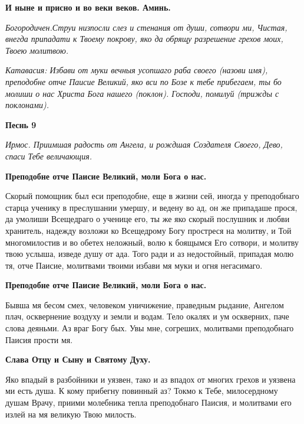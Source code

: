 \bfseries И ныне и присно и во веки веков. Аминь\normalfont{}. 




\itshape Богородичен.\normalfont{}Струи низпосли слез и стенания от души, сотвори ми, Чистая, внегда припадати к Твоему покрову, яко да обрящу разрешение грехов моих, Твоею молитвою.




\itshape Катавасия:\normalfont{} Избави от муки вечныя усопшаго раба своего (\itshape назови имя\normalfont{}), преподобне отче Паисие Великий, яко вси по Бозе к тебе прибегаем, ты бо молиши о нас Христа Бога нашего (\itshape поклон\normalfont{}). Господи, помилуй (\itshape трижды с поклонами\normalfont{}). 




\bfseries Песнь 9 \normalfont{}\nopagebreak




\itshape Ирмос\normalfont{}. Приимшая радость от Ангела, и рождшая Создателя Своего, Дево, спаси Тебе величающия. 




\bfseries Преподобне отче Паисие Великий, моли Бога о нас.\normalfont{}\nopagebreak


Скорый помощник был еси преподобне, еще в жизни сей, иногда у преподобнаго старца ученику в преслушании умершу, и ведену во ад, он же припадаше прося, да умолиши Всещедраго о ученице его, ты же яко скорый послушник и любви хранитель, надежду возложи ко Всещедрому Богу простреся на молитву, и Той многомилостив и во обетех неложный, волю к боящымся Его сотвори, и молитву твою услыша, изведе душу от ада. Того ради и аз недостойный, припадая молю тя, отче Паисие, молитвами твоими избави мя муки и огня негасимаго. 




\bfseries Преподобне отче Паисие Великий, моли Бога о нас.\normalfont{}\nopagebreak


Бывша мя бесом смех, человеком уничижение, праведным рыдание, Ангелом плач, осквернение воздуху и земли и водам. Тело окалях и ум оскверних, паче слова деяньми. Аз враг Богу бых. Увы мне, согреших, молитвами преподобнаго Паисия прости мя. 




\bfseries Слава Отцу и Сыну и Святому Духу\normalfont{}. 




Яко впадый в разбойники и уязвен, тако и аз впадох от многих грехов и уязвена ми есть душа. К кому прибегну повинный аз? Токмо к Тебе, милосердному душам Врачу, приими молебника тепла преподобнаго Паисия, и молитвами его излей на мя великую Твою милость. 




